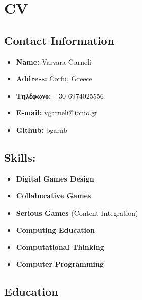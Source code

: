\documentclass[%
    11pt,
  oneside
  ]{memoir}
\let\oldsection\section
\renewcommand{\section}[1]{%
  \oldsection{#1}
  \leavevmode
  \par
  \vspace{\dimexpr-\baselineskip-\parskip}
}
\begin{document}
      \chapter*{CV}
  

  \hypertarget{contact-information}{%
  \section{}\label{contact-information}}
    \begin{minipage}[t]{0.3\textwidth}
      
    \end{minipage}
    \begin{minipage}[t]{0.7\textwidth}
                                            \end{minipage}
  \hypertarget{contact-information}{%
\section{Contact Information}\label{contact-information}}

\begin{itemize}
\tightlist
\item
  \textbf{Name:} Varvara Garneli
\item
  \textbf{Address:} Corfu, Greece
\item
  \textbf{Τηλέφωνο:} +30 6974025556
\item
  \textbf{E-mail:} vgarneli@ionio.gr
\item
  \textbf{Github:} bgarnb
\end{itemize}

\hypertarget{skills}{%
\section{Skills:}\label{skills}}

\begin{itemize}
\tightlist
\item
  \textbf{Digital Games Design}
\item
  \textbf{Collaborative Games}
\item
  \textbf{Serious Games} (Content Integration)
\item
  \textbf{Computing Education}
\item
  \textbf{Computational Thinking}
\item
  \textbf{Computer Programming}
\end{itemize}

\hypertarget{education}{%
\section{Education}\label{education}}
\end{document}
